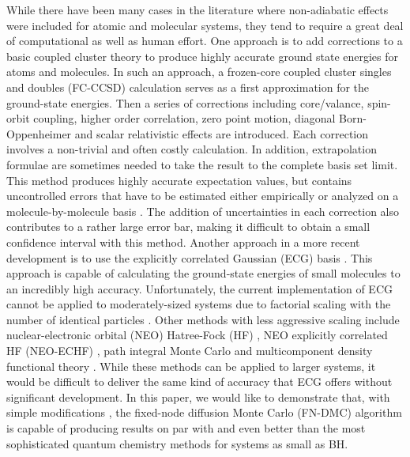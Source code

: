 \documentclass[aps,prl,superscriptaddress,groupedaddress]{revtex4}
\begin{document}
While there have been many cases in the literature where non-adiabatic effects were included for atomic and molecular systems, they tend to require a great deal of computational as well as human effort. One approach is to add corrections to a basic coupled cluster theory to produce highly accurate ground state energies for atoms and molecules\cite{Feller_Corrections}. In such an approach, a frozen-core coupled cluster singles and doubles (FC-CCSD) \cite{Purvis_CCSD} calculation serves as a first approximation for the ground-state energies. Then a series of corrections including core/valance, spin-orbit coupling, higher order correlation, zero point motion, diagonal Born-Oppenheimer and scalar relativistic effects are introduced. Each correction involves a non-trivial and often costly calculation. In addition, extrapolation formulae are sometimes needed to take the result to the complete basis set limit. This method produces highly accurate expectation values, but contains uncontrolled errors that have to be estimated either empirically or analyzed on a molecule-by-molecule basis \cite{Feller_Error}. The addition of uncertainties in each correction also contributes to a rather large error bar, making it difficult to obtain a small confidence interval with this method. Another approach in a more recent development is to use the explicitly correlated Gaussian (ECG) basis \cite{Adamowicz_ECG,Mitroy_ECG}. This approach is capable of calculating the ground-state energies of small molecules to an incredibly high accuracy. Unfortunately, the current implementation of ECG cannot be applied to moderately-sized systems due to factorial scaling with the number of identical particles \cite{Bubin_BH_noBO}. Other methods with less aggressive scaling include nuclear-electronic orbital (NEO) Hatree-Fock (HF) \cite{Sharon_NEO}, NEO explicitly correlated HF (NEO-ECHF) \cite{Sharon_NEOX,Sharon_NEOX1,Sharon_NEOX2}, path integral Monte Carlo \cite{Ilkka_Path,Ilkka_Path1,Ilkka_Path2} and multicomponent density functional theory \cite{Sharon_NEO-DFT,Sharon_NEO-DFT1,Sharon_NEO-DFT2,Sharon_NEO-DFT3,Gross_NEO-DFT,Gross_NEO-DFT1}. While these methods can be applied to larger systems, it would be difficult to deliver the same kind of accuracy that ECG offers without significant development. In this paper, we would like to demonstrate that, with simple modifications \cite{Tubman_ECG}, the fixed-node diffusion Monte Carlo (FN-DMC) algorithm is capable of producing results on par with and even better than the most sophisticated quantum chemistry methods for systems as small as BH.
\end{document}
